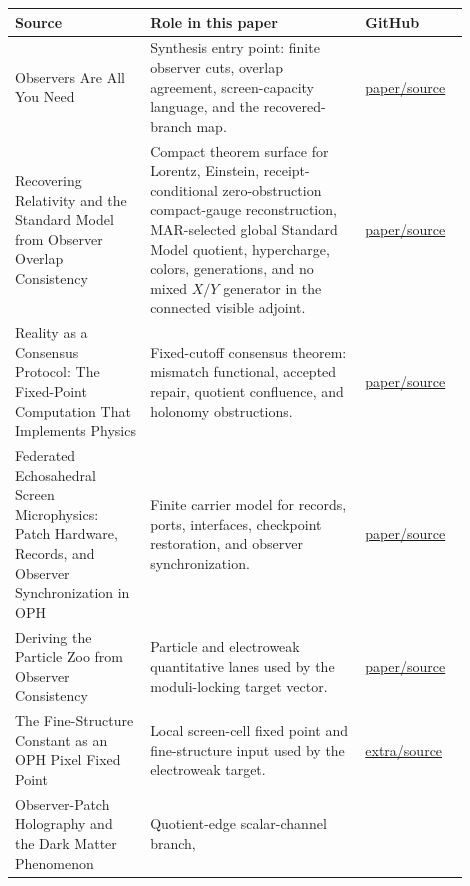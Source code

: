 \documentclass[11pt]{article}
\theoremstyle{remark}
\theoremstyle{plain}
\begin{document}
\begin{longtable}{p{0.27\linewidth}p{0.43\linewidth}p{0.20\linewidth}}
\toprule
\textbf{Source} & \textbf{Role in this paper} & \textbf{GitHub} \\
\midrule
Observers Are All You Need & Synthesis entry point: finite observer cuts, overlap agreement,
screen-capacity language, and the recovered-branch map. &
\href{https://github.com/FloatingPragma/observer-patch-holography/blob/main/paper/observers_are_all_you_need.tex}{paper/source} \\
Recovering Relativity and the Standard Model from Observer Overlap Consistency & Compact theorem surface for Lorentz, Einstein,
receipt-conditional zero-obstruction compact-gauge reconstruction, MAR-selected global Standard Model quotient,
hypercharge, colors, generations, and no mixed \(X/Y\) generator in the connected
visible adjoint. &
\href{https://github.com/FloatingPragma/observer-patch-holography/blob/main/paper/recovering_relativity_and_standard_model_structure_from_observer_overlap_consistency_compact.tex}{paper/source} \\
Reality as a Consensus Protocol: The Fixed-Point Computation That Implements Physics & Fixed-cutoff consensus theorem: mismatch functional, accepted
repair, quotient confluence, and holonomy obstructions. &
\href{https://github.com/FloatingPragma/observer-patch-holography/blob/main/paper/reality_as_consensus_protocol.tex}{paper/source} \\
Federated Echosahedral Screen Microphysics: Patch Hardware, Records, and Observer Synchronization in OPH & Finite carrier model for records, ports,
interfaces, checkpoint restoration, and observer synchronization. &
\href{https://github.com/FloatingPragma/observer-patch-holography/blob/main/paper/screen_microphysics_and_observer_synchronization.tex}{paper/source} \\
Deriving the Particle Zoo from Observer Consistency & Particle and electroweak quantitative lanes used by the
moduli-locking target vector. &
\href{https://github.com/FloatingPragma/observer-patch-holography/blob/main/paper/deriving_the_particle_zoo_from_observer_consistency.tex}{paper/source} \\
The Fine-Structure Constant as an OPH Pixel Fixed Point & Local screen-cell fixed point and
fine-structure input used by the electroweak target. &
\href{https://github.com/FloatingPragma/observer-patch-holography/blob/main/extra/fine_structure_constant_derivation.tex}{extra/source} \\
Observer-Patch Holography and the Dark Matter Phenomenon & Quotient-edge scalar-channel branch,

\end{longtable}
\end{document}
